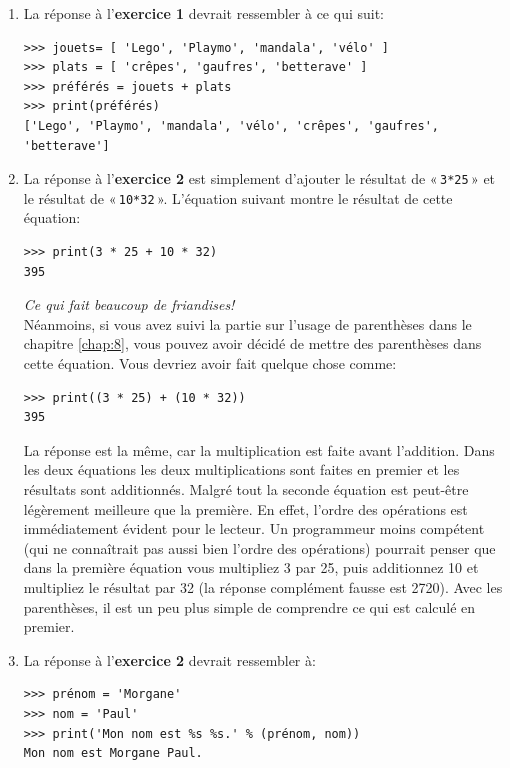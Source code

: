 \begin{enumerate}
\item La réponse à l'\textbf{exercice 1} devrait ressembler à ce qui suit:\\

\begin{small}
\begin{Verbatim}[frame=single,rulecolor=\color{mbleu}, label=à taper]
>>> jouets= [ 'Lego', 'Playmo', 'mandala', 'vélo' ]
>>> plats = [ 'crêpes', 'gaufres', 'betterave' ]
>>> préférés = jouets + plats
>>> print(préférés)
['Lego', 'Playmo', 'mandala', 'vélo', 'crêpes', 'gaufres', 'betterave']
\end{Verbatim}
\end{small}
\item  La réponse à l'\textbf{exercice 2} est simplement d'ajouter le résultat de « \texttt{3*25} » et le résultat de « \texttt{10*32} ». L'équation suivant montre le résultat de cette équation:

\begin{Verbatim}[frame=single,rulecolor=\color{mbleu}, label=à taper]
>>> print(3 * 25 + 10 * 32)
395
\end{Verbatim}
\rm
\emph{Ce qui fait beaucoup de friandises!}\\

Néanmoins, si vous avez suivi la partie sur l'usage de parenthèses dans le chapitre \ref{chap:8}, vous pouvez avoir décidé de mettre des parenthèses dans cette équation. Vous devriez avoir fait quelque chose comme:
\tt
\begin{Verbatim}[frame=single,rulecolor=\color{mbleu}, label=à taper]
>>> print((3 * 25) + (10 * 32))
395
\end{Verbatim}
\rm

La réponse est la même, car la multiplication est faite avant l'addition. Dans les deux équations les deux multiplications sont faites en premier et les résultats sont additionnés. Malgré tout la seconde équation est peut-être légèrement meilleure que la première. En effet, l'ordre des opérations est immédiatement évident pour le lecteur. Un programmeur moins compétent (qui ne connaîtrait pas aussi bien l'ordre des opérations) pourrait penser que dans la première équation vous multipliez 3 par 25, puis additionnez 10 et multipliez le résultat par 32 (la réponse complément fausse est 2720). Avec les parenthèses, il est un peu plus simple de comprendre ce qui est calculé en premier.

\item  La réponse à l'\textbf{exercice 2} devrait ressembler à:
\tt
\begin{Verbatim}[frame=single,rulecolor=\color{mbleu}, label=à taper]
>>> prénom = 'Morgane'
>>> nom = 'Paul'
>>> print('Mon nom est %s %s.' % (prénom, nom))
Mon nom est Morgane Paul.
\end{Verbatim}
\rm

\end{enumerate}

